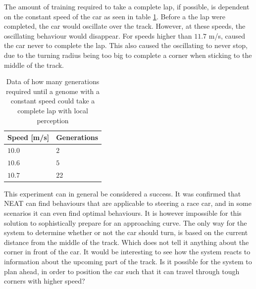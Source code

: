 
The amount of training required to take a complete lap, if possible, is dependent on the constant speed of the car as seen in table \ref{tab:localdata}. Before a the lap were completed, the car would oscillate over the track. However, at these speeds, the oscillating behaviour would disappear. For speeds higher than $11.7$ m/s, caused the car never to complete the lap. This also caused the oscillating to never stop, due to the turning radius being too big to complete a corner when sticking to the middle of the track.

\begin{table}[h!] 
  \centering
  \begin{tabular}{ll}
    \toprule
    Speed [m/s] & Generations\\
    \midrule
    $10.0$ & $2$ \\
    $10.6$ & $5$ \\
    $10.7$ & $22$ \\
    \bottomrule
  \end{tabular}
  \caption{Data of how many generations required until a genome with a constant speed could take a complete lap with local perception}
  \label{tab:localdata}
\end{table}

This experiment can in general be considered a success. It was confirmed that NEAT can find behaviours that are applicable to steering a race car, and in some scenarios it can even find optimal behaviours. It is however impossible for this solution to sophistically prepare for an approaching curve. The only way for the system to determine whether or not the car should turn, is based on the current distance from the middle of the track. Which does not tell it anything about the corner in front of the car. It would be interesting to see how the system reacts to information about the upcoming part of the track. Is it possible for the system to plan ahead, in order to position the car such that it can travel through tough corners with higher speed?


